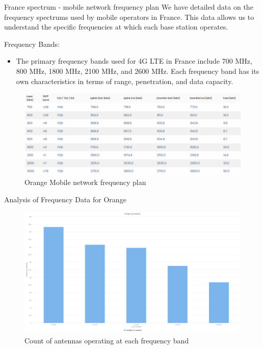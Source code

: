 \begin{frame}{France spectrum - mobile network frequency plan}
    We have detailed data on the frequency spectrums used by mobile operators in France. This data allows us to understand the specific frequencies at which each base station operates.
    \begin{block}{Frequency Bands:}
        \begin{itemize}
            \item The primary frequency bands used for 4G LTE in France include 700 MHz, 800 MHz, 1800 MHz, 2100 MHz, and 2600 MHz.
            Each frequency band has its own characteristics in terms of range, penetration, and data capacity.
        \end{itemize}
    \end{block}
    \begin{figure}
        \includegraphics[height=0.4\paperheight]{images/Altair/Or_spectrum.png}
        \caption{Orange Mobile network frequency plan}
    \end{figure}
\end{frame}

\begin{frame}{Analysis of Frequency Data for Orange}
    \begin{figure}
        \includegraphics[height=0.6\paperheight]{images/Altair/Or_4g_freq_compar.png}
        \caption{Count of antennas operating at each frequency band}
    \end{figure}
\end{frame}

